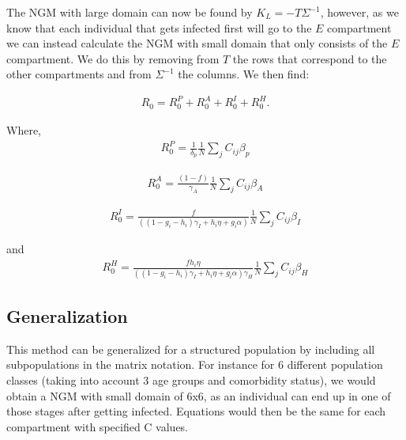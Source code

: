 \documentclass{article}
\begin{document}
The NGM with large domain can now be found by $K_L = - T \Sigma^{-1}$, however, as we know that each individual that gets infected first will go to the $E$ compartment we can instead calculate the NGM with small domain that only consists of the $E$ compartment.
We do this by removing from $T$ the rows that correspond to the other compartments and from $\Sigma^{-1}$ the columns. 
We then find: 

\begin{gather}
R_0 = R_0^P + R_0^A + R_0^I + R_0^H.  
\end{gather}

Where, 
\begin{gather}
R_0^P = \frac{1}{\delta_p} \frac{1}{N} \sum_{j} C_{ij}\beta_p
\end{gather}

\begin{gather}
R_0^A = \frac{(1-f)}{\gamma_A} \frac{1}{N} \sum_{j} C_{ij}\beta_A
\end{gather}

\begin{gather}
R_0^I = \frac{f}{((1-g_i-h_i) \gamma_{I} + h_i \eta + g_i \alpha)} \frac{1}{N} \sum_{j} C_{ij}\beta_I
\end{gather}

and
\begin{gather}
R_0^H = \frac{fh_i \eta}{((1-g_i-h_i) \gamma_{I} + h_i \eta + g_i \alpha)\gamma_H} \frac{1}{N} \sum_{j} C_{ij}\beta_H
\end{gather}

\subsection*{Generalization}

This method can be generalized for a structured population by including all subpopulations in the matrix notation. For instance for 6 different population classes (taking into account 3 age groups and comorbidity status), we would obtain a NGM with small domain of 6x6, as an individual can end up in one of those stages after getting infected. Equations would then be the same for each compartment with specified C values. 
\end{document}
